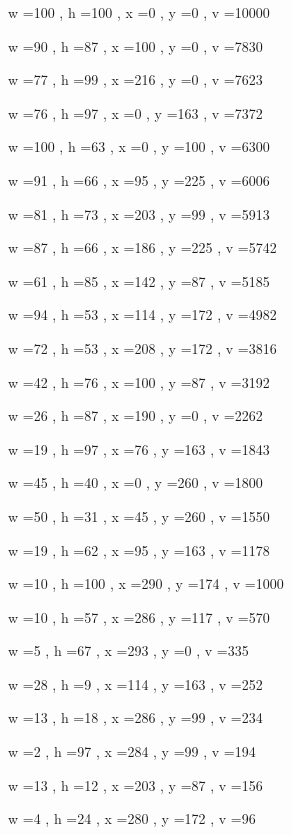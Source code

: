\documentclass[11pt]{article}
\begin{document}
w =100 , h =100 , x =0 , y =0 , v =10000
\par
w =90 , h =87 , x =100 , y =0 , v =7830
\par
w =77 , h =99 , x =216 , y =0 , v =7623
\par
w =76 , h =97 , x =0 , y =163 , v =7372
\par
w =100 , h =63 , x =0 , y =100 , v =6300
\par
w =91 , h =66 , x =95 , y =225 , v =6006
\par
w =81 , h =73 , x =203 , y =99 , v =5913
\par
w =87 , h =66 , x =186 , y =225 , v =5742
\par
w =61 , h =85 , x =142 , y =87 , v =5185
\par
w =94 , h =53 , x =114 , y =172 , v =4982
\par
w =72 , h =53 , x =208 , y =172 , v =3816
\par
w =42 , h =76 , x =100 , y =87 , v =3192
\par
w =26 , h =87 , x =190 , y =0 , v =2262
\par
w =19 , h =97 , x =76 , y =163 , v =1843
\par
w =45 , h =40 , x =0 , y =260 , v =1800
\par
w =50 , h =31 , x =45 , y =260 , v =1550
\par
w =19 , h =62 , x =95 , y =163 , v =1178
\par
w =10 , h =100 , x =290 , y =174 , v =1000
\par
w =10 , h =57 , x =286 , y =117 , v =570
\par
w =5 , h =67 , x =293 , y =0 , v =335
\par
w =28 , h =9 , x =114 , y =163 , v =252
\par
w =13 , h =18 , x =286 , y =99 , v =234
\par
w =2 , h =97 , x =284 , y =99 , v =194
\par
w =13 , h =12 , x =203 , y =87 , v =156
\par
w =4 , h =24 , x =280 , y =172 , v =96
\par
\newpage
\end{document}
